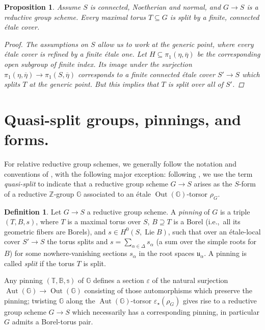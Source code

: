 \documentclass[openany]{amsbook}
\newtheorem{proposition}[theorem]{Proposition}
\theoremstyle{definition}
\newtheorem{definition}[theorem]{Definition}
\theoremstyle{remark}
\numberwithin{equation}{section}
\newcommand{\Z}{\mathbb{Z}}
\newcommand{\G}{\mathbb{G}}
\newcommand{\B}{\mathbb{B}}
\newcommand{\T}{\mathbb{T}}
\newcommand{\ol}[1]{\overline{#1}}
\renewcommand{\-}{\operatorname{-}}
\newcommand{\Aut}{\operatorname{Aut}}
\newcommand{\Out}{\operatorname{Out}}
\newcommand{\on}[1]{\operatorname{#1}}
\newcommand{\fu}{\mathfrak{u}}
\newcommand{\Lie}{\on{Lie}}
\begin{document}
\begin{proposition}
    Assume $S$ is connected, Noetherian and normal, and $G \to S$ is a reductive group scheme. Every maximal torus $T \subseteq G$ is split by a \emph{finite}, \emph{connected} \'etale cover. 
    \begin{proof}
        The assumptions on $S$ allow us to work at the generic point, where every \'etale cover is refined by a finite \'etale one. Let $H \subseteq \pi_1(\eta, \ol{\eta})$ be the corresponding open subgroup of finite index. Its image under the surjection $\pi_1(\eta, \ol{\eta}) \to \pi_1(S, \ol{\eta})$ corresponds to a finite connected \'etale cover $S' \to S$ which splits $T$ at the generic point. But this implies that $T$ is split over all of $S'$. 
    \end{proof}
\end{proposition}


\section{Quasi-split groups, pinnings, and forms.}\label{subsect.quasisplit}
For relative reductive group schemes, we generally follow the notation and conventions of \cite{conradrgs}, with the following major exception: following \cite{ngofl}, we use the term \textit{quasi-split} to indicate that a reductive group scheme $G \to S$ arises as the $S$-form of a reductive $\Z$-group $\G$ associated to an \'etale $\Out(\G)$-torsor $\rho_G$. 

\begin{definition}
    Let $G \to S$ a reductive group scheme. A \textit{pinning} of $G$ is a triple $(T,B,s)$, where $T$ is a maximal torus over $S$, $B \supseteq T$ is a Borel (i.e.,\ all its geometric fibers are Borels), and $s \in H^0(S, \Lie B)$, such that over an \'etale-local cover $S' \to S$ the torus splits and $s = \sum_{\alpha \in \Delta} s_{\alpha}$ (a sum over the simple roots for $B$) for some nowhere-vanishing sections $s_{\alpha}$ in the root spaces $\fu_{\alpha}$. A pinning is called \textit{split} if the torus $T$ is split. 
\end{definition}

Any pinning $(\T, \B, \mathbb{s})$ of $\G$ defines a section $\varepsilon$ of the natural surjection $\Aut(\G) \to \Out(\G)$ consisting of those automorphisms which preserve the pinning; twisting $\G$ along the $\Aut(\G)$-torsor $\varepsilon_\star(\rho_G)$ gives rise to a reductive group scheme $G \to S$ which necessarily has a corresponding pinning, in particular $G$ admits a Borel-torus pair.
\end{document}
